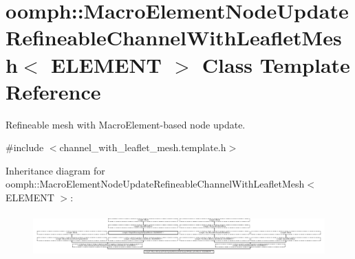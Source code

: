 \hypertarget{classoomph_1_1MacroElementNodeUpdateRefineableChannelWithLeafletMesh}{}\section{oomph\+:\+:Macro\+Element\+Node\+Update\+Refineable\+Channel\+With\+Leaflet\+Mesh$<$ E\+L\+E\+M\+E\+NT $>$ Class Template Reference}
\label{classoomph_1_1MacroElementNodeUpdateRefineableChannelWithLeafletMesh}


Refineable mesh with Macro\+Element-\/based node update.  




{\ttfamily \#include $<$channel\+\_\+with\+\_\+leaflet\+\_\+mesh.\+template.\+h$>$}

Inheritance diagram for oomph\+:\+:Macro\+Element\+Node\+Update\+Refineable\+Channel\+With\+Leaflet\+Mesh$<$ E\+L\+E\+M\+E\+NT $>$\+:\begin{figure}[H]
\begin{center}
\leavevmode
\includegraphics[height=1.696970cm]{classoomph_1_1MacroElementNodeUpdateRefineableChannelWithLeafletMesh}
\end{center}
\end{figure}
